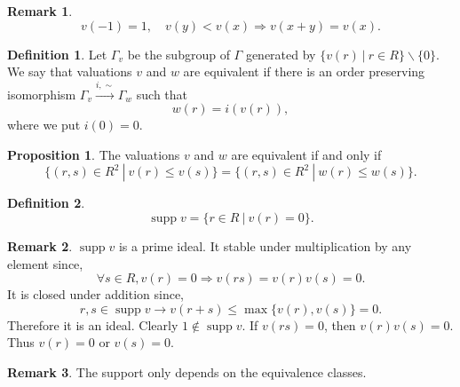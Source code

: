 \documentclass[10pt]{article}
\numberwithin{equation}{section}
\theoremstyle{definition}
\newtheorem{proposition}{Proposition}[subsection]
\newtheorem{definition}{Definition}[subsection]
\newtheorem{remark}{Remark}[subsection]
\DeclareMathOperator{\supp}{supp}
\newcommand{\sep}[0]{\:|\:}
\begin{document}
\begin{remark}
    \begin{equation*}
        v(-1) = 1,\quad v(y)<v(x)\Rightarrow v(x+y) = v(x).
    \end{equation*}
\end{remark}

\begin{definition}
    \label{definition_5_3}
    Let $\Gamma_v$ be the subgroup of $\Gamma$ generated by $\{v(r)\sep r\in R\}\backslash\{0\}$.
    We say that valuations $v$ and $w$ are equivalent if there is an order preserving isomorphism $\Gamma_v\stackrel{i, \sim}{\to}\Gamma_w$ such that
    \begin{equation*}
        w(r) = i(v(r)),
    \end{equation*}
    where we put $i(0)=0$.
\end{definition}
\begin{proposition}
    \label{fact_5_1}
    The valuations $v$ and $w$ are equivalent if and only if
    \begin{equation*}
        \{(r,s)\in R^2\sep v(r)\leq v(s)\} = \{(r,s)\in R^2\sep w(r)\leq w(s)\}.
    \end{equation*}
\end{proposition}
\begin{definition}
    \begin{equation*}
        \supp v = \{r\in R\sep v(r) = 0\}.
    \end{equation*}
    \label{definition_5_4}
\end{definition}
\begin{remark}
    $\supp v$ is a prime ideal. It stable under multiplication by any element since,
    \begin{equation*}
        \forall s\in R, v(r)=0\Rightarrow v(rs) = v(r)v(s) = 0.
    \end{equation*}
    It is closed under addition since,
    \begin{equation*}
        r,s\in\supp v\rightarrow v(r+s) \leq\max\{v(r),v(s)\} = 0.
    \end{equation*}
    Therefore it is an ideal. Clearly $1\not\in\supp v$. If $v(rs) = 0$, then $v(r)v(s) = 0$. Thus $v(r) = 0$ or $v(s) = 0$.
\end{remark}
\begin{remark}
    The support only depends on the equivalence classes.
\end{remark}
\end{document}
